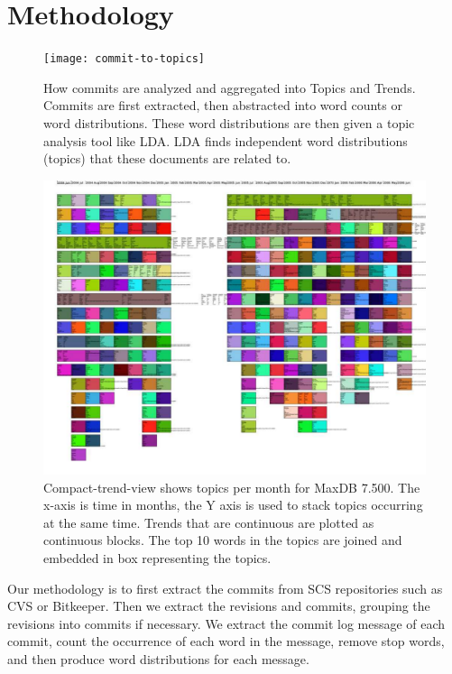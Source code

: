 \documentclass[times, 10pt,twocolumn]{article}
\newcommand{\shrinkit}{\vspace*{-.3em}}
\begin{document}
\shrinkit
\section{Methodology}
\shrinkit
\begin{figure}[t]
  \centering
  \texttt{[image: commit-to-topics]} 
  \caption{How commits are analyzed and aggregated into Topics and Trends. Commits are first extracted, then abstracted into word counts or word distributions. These word distributions are then given a topic analysis tool like LDA. LDA finds independent word distributions (topics) that these documents are related to.}
  \label{fig:commits}
\end{figure}

\begin{figure}
  \centering
  \includegraphics[width=1.0\textwidth]{fixed-time-smear-plot-scaled}
  \caption{Compact-trend-view shows topics per month for MaxDB
    7.500. The x-axis is time in months, the Y axis is used to stack
    topics occurring at the same time. Trends that are continuous are
    plotted as continuous blocks. The top 10 words in the topics are
    joined and embedded in box representing the topics.}
  \label{fig:topicsmear}
\end{figure}


Our methodology is to first extract the commits from SCS repositories
such as CVS or Bitkeeper. Then we extract the revisions and commits,
grouping the revisions into commits if necessary. We extract the
commit log message of each commit, count the occurrence of each word
in the message, remove stop words, and then produce word distributions
for each message.
\end{document}
